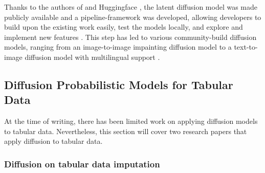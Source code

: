 Thanks to the authors of \cite{rombach2022HighResolutionImageSynthesis} and Huggingface \cite{huggingface2023HuggingFaceAI}, the latent diffusion model was made publicly available and a
pipeline-framework was developed, allowing developers to build upon the existing work easily, test the models locally, and explore and implement new features \cite{huggingface2023DiffusersPipelines}.
This step has led to various community-build diffusion models, ranging from an image-to-image impainting diffusion model to a text-to-image diffusion model with multilingual support \cite{huggingface2023CommunityExamples}.

\subsection{Diffusion Probabilistic Models for Tabular Data}
\label{ch:preliminaries-generativeAlgorithms-diffusionProbabilisticModelsTabularData}
At the time of writing, there has been limited work on applying diffusion models to tabular data.
Nevertheless, this section will cover two research papers that apply diffusion to tabular data.

\subsubsection{Diffusion on tabular data imputation}

